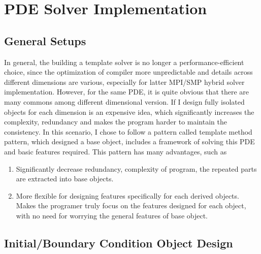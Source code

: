 




\section{PDE Solver Implementation}
\subsection{General Setups}
In general, the building a template solver is no longer a performance-efficient choice, since the 
optimization of compiler more unpredictable and details across different dimensions are various, 
especially for latter MPI/SMP hybrid solver implementation.
However, for the same PDE, it is quite obvious that there are many commons among different dimensional version.
If I design fully isolated objects for each dimension is an expensive idea, 
which significantly increases the complexity, redundancy and makes the program harder to maintain the consistency.
In this scenario, I chose to follow a pattern called template method pattern, which designed a base object,
includes a framework of solving this PDE and basic features required. 
This pattern has many advantages, such as 
\begin{enumerate}
  \item Significantly decrease redundancy, complexity of program, the repeated parts are extracted into base objects. 
  \item More flexible for designing features specifically for each derived objects. Makes the programer truly focus on the features designed for each object, 
  with no need for worrying the general features of base object.
\end{enumerate}


\subsection{Initial/Boundary Condition Object Design}

